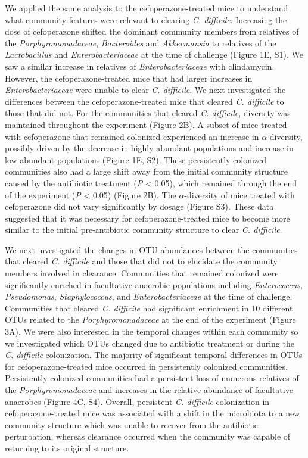 \documentclass[12pt,]{article}
\begin{document}
We applied the same analysis to the cefoperazone-treated mice to
understand what community features were relevant to clearing \emph{C.
difficile}. Increasing the dose of cefoperazone shifted the dominant
community members from relatives of the \emph{Porphyromonadaceae},
\emph{Bacteroides} and \emph{Akkermansia} to relatives of the
\emph{Lactobacillus} and \emph{Enterobacteriaceae} at the time of
challenge (Figure 1E, S1). We saw a similar increase in relatives of
\emph{Enterobacteriaceae} with clindamycin. However, the
cefoperazone-treated mice that had larger increases in
\emph{Enterobacteriaceae} were unable to clear \emph{C. difficile}. We
next investigated the differences between the cefoperazone-treated mice
that cleared \emph{C. difficile} to those that did not. For the
communities that cleared \emph{C. difficile}, diversity was maintained
throughout the experiment (Figure 2B). A subset of mice treated with
cefoperazone that remained colonized experienced an increase in
\(\alpha\)-diversity, possibly driven by the decrease in highly abundant
populations and increase in low abundant populations (Figure 1E, S2).
These persistently colonized communities also had a large shift away
from the initial community structure caused by the antibiotic treatment
(\emph{P} \textless{} 0.05), which remained through the end of the
experiment (\emph{P} \textless{} 0.05) (Figure 2B). The
\(\alpha\)-diversity of mice treated with cefoperazone did not vary
significantly by dosage (Figure S3). These data suggested that it was
necessary for cefoperazone-treated mice to become more similar to the
initial pre-antibiotic community structure to clear \emph{C. difficile}.

We next investigated the changes in OTU abundances between the
communities that cleared \emph{C. difficile} and those that did not to
elucidate the community members involved in clearance. Communities that
remained colonized were significantly enriched in facultative anaerobic
populations including \emph{Enterococcus}, \emph{Pseudomonas},
\emph{Staphylococcus}, and \emph{Enterobacteriaceae} at the time of
challenge. Communities that cleared \emph{C. difficile} had significant
enrichment in 10 different OTUs related to the \emph{Porphyromonadaceae}
at the end of the experiment (Figure 3A). We were also interested in the
temporal changes within each community so we investigated which OTUs
changed due to antibiotic treatment or during the \emph{C. difficile}
colonization. The majority of significant temporal differences in OTUs
for cefoperazone-treated mice occurred in persistently colonized
communities. Persistently colonized communities had a persistent loss of
numerous relatives of the \emph{Porphyromonadaceae} and increases in the
relative abundance of facultative anaerobes (Figure 4C, S4). Overall,
persistent \emph{C. difficile} colonization in cefoperazone-treated mice
was associated with a shift in the microbiota to a new community
structure which was unable to recover from the antibiotic perturbation,
whereas clearance occurred when the community was capable of returning
to its original structure.
\end{document}
